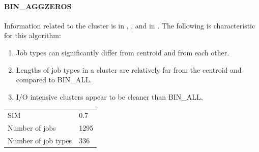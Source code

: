 \documentclass[]{llncs}
\begin{document}
\paragraph{BIN\_AGGZEROS}
Information related to the cluster is in , , and in .
The following is characteristic for this algorithm:

\begin{enumerate}
 \item Job types can significantly differ from centroid and from each other.
 \item Lengths of job types in a cluster are relatively far from the centroid and compared to BIN\_ALL.
 \item I/O intensive clusters appear to be cleaner than BIN\_ALL.
\end{enumerate}


\begingroup
  \begin{tabular}{ll}
    \centering
    SIM &  0.7 \\
    Number of jobs & 1295 \\
    Number of job types & 336 \\
  \end{tabular}
  \label{tab:bin_aggzeros:stats}
\endgroup
\end{document}

